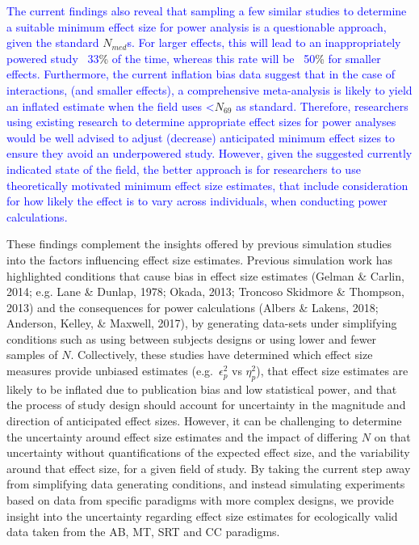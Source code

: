\documentclass[
  man]{apa6}
\begin{document}
\textcolor{blue}{The current findings also reveal that sampling a few similar studies to determine a suitable minimum effect size for power analysis is a questionable approach, given the standard} \(N_{med}\)\textcolor{blue}{s. For larger effects, this will lead to an inappropriately powered study ~33}\% \textcolor{blue}{ of the time, whereas this rate will be ~50}\% \textcolor{blue}{for smaller effects. Furthermore, the current inflation bias data suggest that in the case of interactions, (and smaller effects), a comprehensive meta-analysis is likely to yield an inflated estimate when the field uses <}\(N_{69}\) \textcolor{blue}{as standard. Therefore, researchers using existing research to determine appropriate effect sizes for power analyses would be well advised to adjust (decrease) anticipated minimum effect sizes to ensure they avoid an underpowered study. However, given the suggested currently indicated state of the field, the better approach is for researchers to use theoretically motivated minimum effect size estimates, that include consideration for how likely the effect is to vary across individuals, when conducting power calculations.}

These findings complement the insights offered by previous simulation studies into the factors influencing effect size estimates. Previous simulation work has highlighted conditions that cause bias in effect size estimates (Gelman \& Carlin, 2014; e.g. Lane \& Dunlap, 1978; Okada, 2013; Troncoso Skidmore \& Thompson, 2013) and the consequences for power calculations (Albers \& Lakens, 2018; Anderson, Kelley, \& Maxwell, 2017), by generating data-sets under simplifying conditions such as using between subjects designs or using lower and fewer samples of \(N\). Collectively, these studies have determined which effect size measures provide unbiased estimates (e.g.~\(\epsilon_{p}^2\) vs \(\eta_{p}^2\)), that effect size estimates are likely to be inflated due to publication bias and low statistical power, and that the process of study design should account for uncertainty in the magnitude and direction of anticipated effect sizes. However, it can be challenging to determine the uncertainty around effect size estimates and the impact of differing \(N\) on that uncertainty without quantifications of the expected effect size, and the variability around that effect size, for a given field of study. By taking the current step away from simplifying data generating conditions, and instead simulating experiments based on data from specific paradigms with more complex designs, we provide insight into the uncertainty regarding effect size estimates for ecologically valid data taken from the AB, MT, SRT and CC paradigms.
\end{document}
